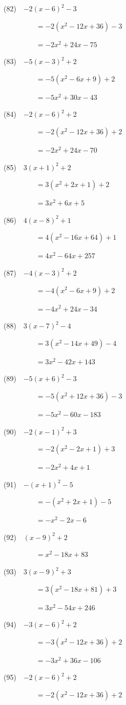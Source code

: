 \documentclass[a4j,twocolumn,10pt,fleqn]{jarticle}
\begin{document}
(82)~~$-2(x-6)^2-3$

~~~~~~~~~$=-2(x^2-12x +36)-3$

~~~~~~~~~$=-2x^2 +24x-75$

(83)~~$-5(x-3)^2 +2$

~~~~~~~~~$=-5(x^2-6x +9) +2$

~~~~~~~~~$=-5x^2 +30x-43$

(84)~~$-2(x-6)^2 +2$

~~~~~~~~~$=-2(x^2-12x +36) +2$

~~~~~~~~~$=-2x^2 +24x-70$

(85)~~$3(x +1)^2 +2$

~~~~~~~~~$=3(x^2 +2x +1) +2$

~~~~~~~~~$=3x^2 +6x +5$

(86)~~$4(x-8)^2 +1$

~~~~~~~~~$=4(x^2-16x +64) +1$

~~~~~~~~~$=4x^2-64x +257$

(87)~~$-4(x-3)^2 +2$

~~~~~~~~~$=-4(x^2-6x +9) +2$

~~~~~~~~~$=-4x^2 +24x-34$

(88)~~$3(x-7)^2-4$

~~~~~~~~~$=3(x^2-14x +49)-4$

~~~~~~~~~$=3x^2-42x +143$

(89)~~$-5(x +6)^2-3$

~~~~~~~~~$=-5(x^2 +12x +36)-3$

~~~~~~~~~$=-5x^2-60x-183$

(90)~~$-2(x-1)^2 +3$

~~~~~~~~~$=-2(x^2-2x +1) +3$

~~~~~~~~~$=-2x^2 +4x +1$

(91)~~$-(x +1)^2-5$

~~~~~~~~~$=-(x^2 +2x +1)-5$

~~~~~~~~~$=-x^2-2x-6$

(92)~~$(x-9)^2 +2$

~~~~~~~~~$=x^2-18x +83$

(93)~~$3(x-9)^2 +3$

~~~~~~~~~$=3(x^2-18x +81) +3$

~~~~~~~~~$=3x^2-54x +246$

(94)~~$-3(x-6)^2 +2$

~~~~~~~~~$=-3(x^2-12x +36) +2$

~~~~~~~~~$=-3x^2 +36x-106$

(95)~~$-2(x-6)^2 +2$

~~~~~~~~~$=-2(x^2-12x +36) +2$
\end{document}
